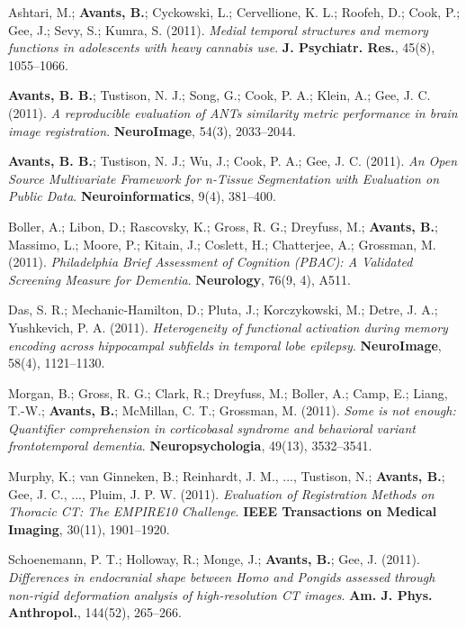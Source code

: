 \documentclass[10pt,letterpaper]{article}
\begin{document}
\begin{enumerate}
{  %
  \item Ashtari, M.; \textbf{Avants, B.}; Cyckowski, L.; Cervellione, K. L.; Roofeh, D.; Cook, P.; Gee, J.; Sevy, S.; Kumra, S. (2011). \textit{Medial temporal structures and memory functions in adolescents with heavy cannabis use}. \textbf{J. Psychiatr. Res.}, 45(8), 1055--1066.
  \item \textbf{Avants, B. B.}; Tustison, N. J.; Song, G.; Cook, P. A.; Klein, A.; Gee, J. C. (2011). \textit{A reproducible evaluation of ANTs similarity metric performance in brain image registration}. \textbf{NeuroImage}, 54(3), 2033--2044.
  \item \textbf{Avants, B. B.}; Tustison, N. J.; Wu, J.; Cook, P. A.; Gee, J. C. (2011). \textit{An Open Source Multivariate Framework for n-Tissue Segmentation with Evaluation on Public Data}. \textbf{Neuroinformatics}, 9(4), 381--400.
  \item Boller, A.; Libon, D.; Rascovsky, K.; Gross, R. G.; Dreyfuss, M.; \textbf{Avants, B.}; Massimo, L.; Moore, P.; Kitain, J.; Coslett, H.; Chatterjee, A.; Grossman, M. (2011). \textit{Philadelphia Brief Assessment of Cognition (PBAC): A Validated Screening Measure for Dementia}. \textbf{Neurology}, 76(9, 4), A511.
  \item Das, S. R.; Mechanic-Hamilton, D.; Pluta, J.; Korczykowski, M.; Detre, J. A.; Yushkevich, P. A. (2011). \textit{Heterogeneity of functional activation during memory encoding across hippocampal subfields in temporal lobe epilepsy}. \textbf{NeuroImage}, 58(4), 1121--1130.
  \item Morgan, B.; Gross, R. G.; Clark, R.; Dreyfuss, M.; Boller, A.; Camp, E.; Liang, T.-W.; \textbf{Avants, B.}; McMillan, C. T.; Grossman, M. (2011). \textit{Some is not enough: Quantifier comprehension in corticobasal syndrome and behavioral variant frontotemporal dementia}. \textbf{Neuropsychologia}, 49(13), 3532--3541.
  \item Murphy, K.; van Ginneken, B.; Reinhardt, J. M., ..., Tustison, N.; \textbf{Avants, B.}; Gee, J. C., ..., Pluim, J. P. W. (2011). \textit{Evaluation of Registration Methods on Thoracic CT: The EMPIRE10 Challenge}. \textbf{IEEE Transactions on Medical Imaging}, 30(11), 1901--1920.
  \item Schoenemann, P. T.; Holloway, R.; Monge, J.; \textbf{Avants, B.}; Gee, J. (2011). \textit{Differences in endocranial shape between Homo and Pongids assessed through non-rigid deformation analysis of high-resolution CT images}. \textbf{Am. J. Phys. Anthropol.}, 144(52), 265--266.
}
\end{enumerate}
\end{document}
